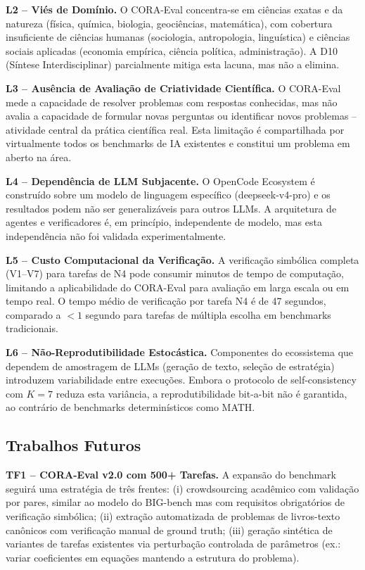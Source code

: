 \textbf{L2 -- Viés de Domínio.} O CORA-Eval concentra-se em ciências
exatas e da natureza (física, química, biologia, geociências,
matemática), com cobertura insuficiente de ciências humanas (sociologia,
antropologia, linguística) e ciências sociais aplicadas (economia
empírica, ciência política, administração). A D10 (Síntese
Interdisciplinar) parcialmente mitiga esta lacuna, mas não a elimina.

\textbf{L3 -- Ausência de Avaliação de Criatividade Científica.} O
CORA-Eval mede a capacidade de resolver problemas com respostas
conhecidas, mas não avalia a capacidade de formular novas perguntas ou
identificar novos problemas -- atividade central da prática científica
real. Esta limitação é compartilhada por virtualmente todos os benchmarks
de IA existentes e constitui um problema em aberto na área.

\textbf{L4 -- Dependência de LLM Subjacente.} O OpenCode Ecosystem é
construído sobre um modelo de linguagem específico (deepseek-v4-pro) e
os resultados podem não ser generalizáveis para outros LLMs. A
arquitetura de agentes e verificadores é, em princípio, independente de
modelo, mas esta independência não foi validada experimentalmente.

\textbf{L5 -- Custo Computacional da Verificação.} A verificação
simbólica completa (V1--V7) para tarefas de N4 pode consumir minutos de
tempo de computação, limitando a aplicabilidade do CORA-Eval para
avaliação em larga escala ou em tempo real. O tempo médio de verificação
por tarefa N4 é de 47 segundos, comparado a $< 1$ segundo para tarefas
de múltipla escolha em benchmarks tradicionais.

\textbf{L6 -- Não-Reprodutibilidade Estocástica.} Componentes do
ecossistema que dependem de amostragem de LLMs (geração de texto,
seleção de estratégia) introduzem variabilidade entre execuções. Embora
o protocolo de self-consistency com $K=7$ reduza esta variância, a
reprodutibilidade bit-a-bit não é garantida, ao contrário de benchmarks
determinísticos como MATH.

\subsection{Trabalhos Futuros}

\textbf{TF1 -- CORA-Eval v2.0 com 500+ Tarefas.} A expansão do benchmark
seguirá uma estratégia de três frentes: (i) crowdsourcing acadêmico com
validação por pares, similar ao modelo do BIG-bench mas com requisitos
obrigatórios de verificação simbólica; (ii) extração automatizada de
problemas de livros-texto canônicos com verificação manual de ground
truth; (iii) geração sintética de variantes de tarefas existentes via
perturbação controlada de parâmetros (ex.: variar coeficientes em
equações mantendo a estrutura do problema).

